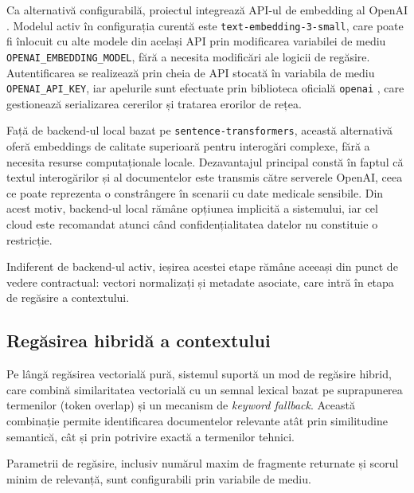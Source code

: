 \documentclass[12pt, a4paper, oneside, romanian]{teza-upb}
\begin{document}
Ca alternativă configurabilă, 
proiectul integrează API-ul de embedding al OpenAI \cite{openai_embeddings}. 
Modelul activ în configurația curentă este \texttt{text-embedding-3-small}, 
care poate fi înlocuit cu alte modele din același API prin modificarea 
variabilei de mediu \texttt{OPENAI\_EMBEDDING\_MODEL}, fără a necesita 
modificări ale logicii de regăsire. Autentificarea se realizează prin cheia 
de API stocată în variabila de mediu \texttt{OPENAI\_API\_KEY}, iar apelurile 
sunt efectuate prin biblioteca oficială \texttt{openai} \cite{openai_api}, 
care gestionează serializarea cererilor și tratarea erorilor de rețea.

Față de backend-ul local bazat pe \texttt{sentence-transformers}, această 
alternativă oferă embeddings de calitate superioară pentru interogări complexe, 
fără a necesita resurse computaționale locale. Dezavantajul principal constă 
în faptul că textul interogărilor și al documentelor este transmis către 
serverele OpenAI, ceea ce poate reprezenta o constrângere în scenarii cu date 
medicale sensibile. Din acest motiv, backend-ul local rămâne opțiunea implicită 
a sistemului, iar cel cloud este recomandat atunci când confidențialitatea 
datelor nu constituie o restricție.

Indiferent de backend-ul activ, ieșirea acestei etape rămâne aceeași din punct de vedere contractual: vectori normalizați și metadate asociate, care intră în etapa de regăsire a contextului.

\subsection{Regăsirea hibridă a contextului}

Pe lângă regăsirea vectorială pură, sistemul suportă un mod de regăsire hibrid, care combină similaritatea vectorială cu un semnal lexical bazat pe suprapunerea termenilor (token overlap) și un mecanism de \textit{keyword fallback}.  Această combinație permite identificarea documentelor relevante atât prin similitudine semantică, cât și prin potrivire exactă a termenilor tehnici.

Parametrii de regăsire, inclusiv numărul maxim de fragmente returnate și scorul minim de relevanță, sunt configurabili prin variabile de mediu.
\end{document}
